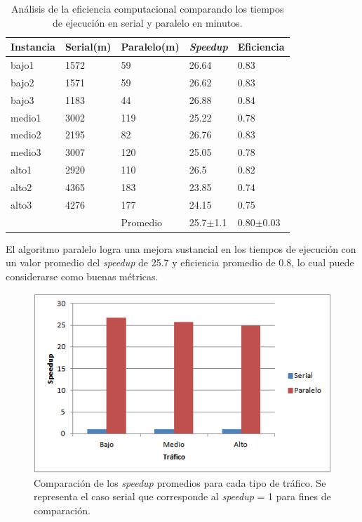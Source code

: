 \begin{table}[H]
	\renewcommand{\arraystretch}{1.2}
	\caption[Análisis de la eficiencia computacional.]{Análisis de la eficiencia computacional comparando los tiempos de ejecución en serial y paralelo en minutos. }
	\label{table:analisis_speedup}
	\centering
	\begin{tabular}{p{2.5cm}p{2.5cm}p{2.5cm}p{2.5cm}p{2.5cm} }
		\hline
		
		Instancia& 
		Serial(m) & 
		Paralelo(m) &
		\emph{Speedup} &
		Eficiencia
		\\ 
		\hline
		bajo1  & 1572 & 59 & 26.64 & 0.83\\
		bajo2  & 1571 & 59 & 26.62 & 0.83\\
		bajo3  & 1183 & 44 & 26.88 & 0.84\\
		
		medio1  & 3002 & 119 & 25.22 & 0.78\\
		medio2  & 2195 & 82 & 26.76 & 0.83\\
		medio3  & 3007 & 120 & 25.05 & 0.78\\
		
		alto1  & 2920 & 110 & 26.5 & 0.82\\
		alto2  & 4365 & 183 & 23.85 & 0.74\\
		alto3  & 4276 & 177 & 24.15 & 0.75\\
		\hline
		  &  & Promedio & 25.7$\pm$1.1 & 0.80$\pm$0.03\\
		
		\hline
	\end{tabular}
\end{table}


El algoritmo paralelo logra una mejora sustancial en los tiempos de ejecución con un valor promedio del \emph{speedup} de 25.7  y  eficiencia promedio de 0.8, lo cual puede considerarse como buenas métricas.

\begin{figure}[H]
	\centering
	\includegraphics[width=0.8\linewidth]{Figures/speedup1}
	\caption[Comparación de los \emph{speedup} promedios para cada tipo de tráfico.]{Comparación de los \emph{speedup} promedios para cada tipo de tráfico. Se representa el caso serial que corresponde al \emph{speedup} = 1 para fines de comparación.}
	\label{fig:speedup1}
\end{figure}

